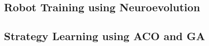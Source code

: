 \subsection{Robot Training using Neuroevolution}


\subsection{Strategy Learning using ACO and GA}

